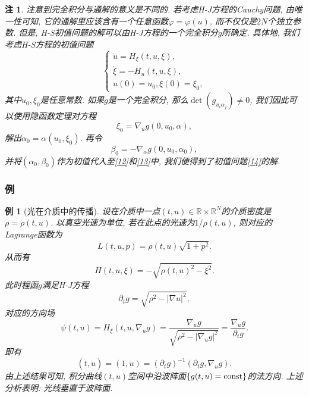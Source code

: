 \documentclass[12pt,a4paper]{article}
\newtheorem{example}[theorem]{例}
\newtheorem{remark}[theorem]{注}
\begin{document}
\begin{remark}
    注意到完全积分与通解的意义是不同的. 若考虑H-J方程的Cauchy问题, 由唯一性可知, 它的通解里应该含有一个任意函数$\varphi = \varphi(u)$, 而不仅仅是$2N$个独立参数.
    但是, H-S初值问题的解可以由H-J方程的一个完全积分$g$所确定. 具体地, 我们考虑H-S方程的初值问题 
    \begin{equation}\label{14}
        \begin{cases} 
            \dot u = H_{\xi}(t, u, \xi), \\ 
            \dot \xi = -H_u(t, u, \xi), \\  
            u(0) = u_0, \xi(0) = \xi_0,  
        \end{cases}
    \end{equation}
    其中$u_0, \xi_0$是任意常数. 如果$g$是一个完全积分, 那么$\det(g_{u_i\alpha_j}) \neq 0$, 我们因此可以使用隐函数定理对方程 
    \begin{equation*}
        \xi_0 = \nabla_ug(0, u_0, \alpha), 
    \end{equation*}
    解出$\alpha_0 = \alpha(u_0, \xi_0)$. 再令 
    \begin{equation*}
        \beta_0 = -\nabla_{\alpha}g(0, u_0, \alpha_0), 
    \end{equation*}
    并将$(\alpha_0, \beta_0)$作为初值代入至\eqref{12}和\eqref{13}中, 我们便得到了初值问题\eqref{14}的解.
\end{remark}

\subsubsection{例}

\begin{example}[光在介质中的传播]
    设在介质中一点$(t, u) \in \mathbb{R} \times \mathbb{R}^N$的介质密度是$\rho = \rho(t, u)$.
    以真空光速为单位, 若在此点的光速为$1/\rho(t, u)$, 则对应的Lagrange函数为 
    \begin{equation*}
        L(t, u, p) = \rho(t, u)\sqrt{1 + p^2}.
    \end{equation*}
    从而有 
    \begin{equation*}
        H(t, u, \xi) = -\sqrt{\rho(t, u)^2 - \xi^2}.
    \end{equation*}
    此时程函$g$满足H-J方程 
    \begin{equation*}
        \partial_tg = \sqrt{\rho^2 - |\nabla u|^2},
    \end{equation*}
    对应的方向场 
    \begin{equation*}
        \psi(t, u) = H_{\xi}(t, u, \nabla_ug) = \frac{\nabla_ug}{\sqrt{\rho^2 - |\nabla_ug|^2}} = \frac{\nabla_ug}{\partial_tg}.
    \end{equation*}
    即有 
    \begin{equation*}
        (\dot t, \dot u) = (1, \dot u) = (\partial_tg)^{-1}(\partial_tg, \nabla_ug).
    \end{equation*}
    由上述结果可知, 积分曲线$(t, u)$空间中沿波阵面$\{g(t, u) = {\rm const}\}$的法方向.
    上述分析表明: 光线垂直于波阵面.
\end{example}
\end{document}
